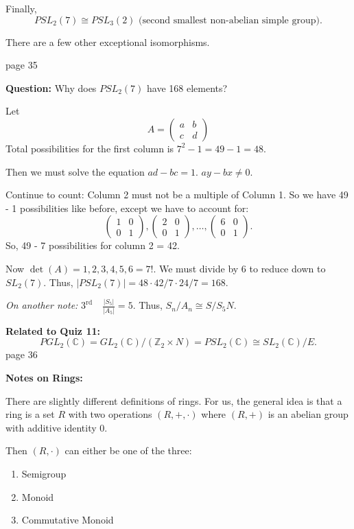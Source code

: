 \documentclass{article}
\begin{document}
Finally,
\[
PSL_2(7) \cong PSL_3(2) \text{ (second smallest non-abelian simple group)}.
\]

There are a few other exceptional isomorphisms.

\newpage
\noindent page 35

\textbf{Question:} Why does $PSL_2(7)$ have 168 elements?

Let
\[
A = \begin{pmatrix}
a & b \\
c & d
\end{pmatrix}
\]
Total possibilities for the first column is $7^2 - 1 = 49 - 1 = 48$.

Then we must solve the equation $ad - bc = 1$. $ay - bx \neq 0$.

Continue to count: Column 2 must not be a multiple of Column 1. So we have 49 - 1 possibilities like before, except we have to account for:
\[
\begin{pmatrix}
1 & 0 \\
0 & 1
\end{pmatrix},
\begin{pmatrix}
2 & 0 \\
0 & 1
\end{pmatrix},
\ldots,
\begin{pmatrix}
6 & 0 \\
0 & 1
\end{pmatrix}.
\]
So, 49 - 7 possibilities for column 2 = 42.

Now $\det(A) = 1, 2, 3, 4, 5, 6 = 7!$. We must divide by 6 to reduce down to $SL_2(7)$. Thus, $|PSL_2(7)| = 48 \cdot 42 / 7 \cdot 24 / 7 = 168$.

\textit{On another note:} $3^{\text{rd}} \quad \frac{\left| S_5 \right|}{|A_5|} = 5$. Thus, $S_n / A_n \cong S / S_5 N$.

\textbf{Related to Quiz 11:}
\[
PGL_2(\mathbb{C}) = GL_2(\mathbb{C}) / (\mathbb{Z}_2 \times N) = PSL_2(\mathbb{C}) \cong SL_2(\mathbb{C}) / E.
\]
\newpage
\noindent page 36

\textbf{Notes on Rings:}

There are slightly different definitions of rings. For us, the general idea is that a ring is a set $R$ with two operations $(R, +, \cdot)$ where $(R, +)$ is an abelian group with additive identity $0$.

Then $(R, \cdot)$ can either be one of the three:
\begin{enumerate}
    \item Semigroup
    \item Monoid
    \item Commutative Monoid
\end{enumerate}
\end{document}
